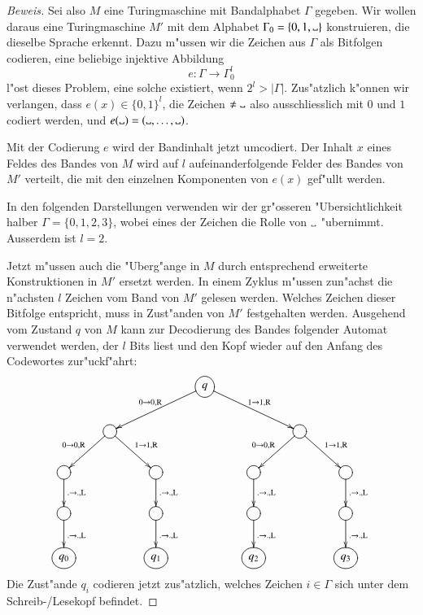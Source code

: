 \begin{proof}[Beweis]
Sei also $M$ eine Turingmaschine mit Bandalphabet $\Gamma$ gegeben. Wir
wollen daraus eine Turingmaschine $M'$ mit dem Alphabet
$\Gamma_0= \{0,1,\blank\}$ konstruieren, die dieselbe
Sprache erkennt. Dazu m"ussen wir die Zeichen aus $\Gamma$ als
Bitfolgen codieren, eine beliebige injektive Abbildung
\[
e\colon\Gamma\to \Gamma_0^l
\]
l"ost dieses Problem, eine solche existiert, wenn $2^l>|\Gamma|$.
Zus"atzlich k"onnen
wir verlangen, dass $e(x)\in \{0,1\}^l$, die Zeichen $\ne\blank$ 
also ausschliesslich mit $0$ und $1$ codiert werden, und
$e(\blank)=(\blank,\dots,\blank)$.

Mit der Codierung $e$ wird der Bandinhalt jetzt umcodiert. Der Inhalt
$x$ 
eines Feldes des Bandes von $M$ wird auf $l$ aufeinanderfolgende Felder
des Bandes von $M'$ verteilt, die mit den einzelnen Komponenten
von $e(x)$ gef"ullt werden. 

In den folgenden Darstellungen verwenden wir der gr"osseren
"Ubersichtlichkeit halber $\Gamma=\{0,1,2,3\}$, wobei eines der
Zeichen die Rolle von $\blank$ "ubernimmt. Ausserdem ist $l=2$.

Jetzt m"ussen auch die "Uberg"ange in $M$
durch entsprechend erweiterte Konstruktionen in $M'$ ersetzt werden.
In einem Zyklus m"ussen zun"achst die n"achsten $l$ Zeichen vom Band
von $M'$ gelesen werden. Welches Zeichen dieser Bitfolge entspricht,
muss in Zust"anden von $M'$ festgehalten werden. Ausgehend vom Zustand 
$q$ von $M$ kann zur Decodierung 
des Bandes folgender Automat verwendet werden, der $l$ Bits liest
und den Kopf wieder auf den Anfang des Codewortes zur"uckf"ahrt:
\[
\entrymodifiers={++[o][F]}
\xymatrix{
*+\txt{}
	&*+\txt{}
		&*+\txt{}
			&q\ar[dll]_{0\to 0,\text{R}} \ar[drr]^{1\to 1,\text{R}}
\\
*+\txt{}
	&\ar[dl]_{0\to 0,\text{R}} \ar[dr]^{1\to 1,\text{R}}
		&*+\txt{}
			&*+\txt{}
				&*+\txt{}
					&\ar[dl]_{0\to 0,\text{R}} \ar[dr]^{1\to 1,\text{R}}
						&*+\txt{}
\\
\ar[d]^{.\to .,\text{L}}
	&*+\txt{}
		&\ar[d]^{.\to .,\text{L}}
			&*+\txt{}
				&\ar[d]^{.\to .,\text{L}}
					&*+\txt{}
						&\ar[d]^{.\to .,\text{L}}
\\
\ar[d]^{.\to .,\text{L}}
	&*+\txt{}
		&\ar[d]^{.\to .,\text{L}}
			&*+\txt{}
				&\ar[d]^{.\to .,\text{L}}
					&*+\txt{}
						&\ar[d]^{.\to .,\text{L}}
\\
q_0
	&*+\txt{}
		&q_1
			&*+\txt{}
				&q_2
					&*+\txt{}
						&q_3
}
\]
Die Zust"ande $q_i$ codieren jetzt zus"atzlich, welches 
Zeichen $i\in\Gamma$ sich unter dem Schreib-/Lesekopf befindet.


\end{proof}
